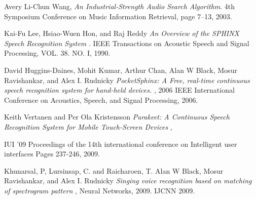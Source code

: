 \documentclass[anon]{CI}
\begin{document}
\begin{thebibliography}{9}

  Avery Li-Chun Wang,
  \emph{An Industrial-Strength Audio Search Algorithm}.
4th Symposium Conference on Music Information Retrieval, page 7--13,
  2003.

  Kai-Fu Lee, Hsiao-Wuen Hon, and Raj Reddy
  \emph{An Overview of the SPHINX Speech 
Recognition System }.
IEEE Transactions on Acoustic Speech  and Signal Processing, VOL. 38. NO. I, 
  1990.

 David Huggins-Daines, Mohit Kumar, Arthur Chan,
Alan W Black, Mosur Ravishankar, and Alex I. Rudnicky
  \emph{PocketSphinx: A Free, real-time continuous speech recognition system for hand-held devices.
 },
2006 IEEE International Conference on Acoustics, Speech, and Signal Processing,
  2006.

 Keith Vertanen and Per Ola Kristensson 
  \emph{Parakeet: A Continuous Speech Recognition System 
for Mobile Touch-Screen Devices 
 },

IUI '09 Proceedings of the 14th international conference on Intelligent user interfaces
Pages 237-246,
 2009.

 Khunarsal, P, Lursinsap, C.  and Raicharoen, T.
Alan W Black, Mosur Ravishankar, and Alex I. Rudnicky
  \emph{Singing voice recognition based on matching of spectrogram pattern }, Neural Networks, 2009. IJCNN 2009.
\end{thebibliography}
\end{document}
